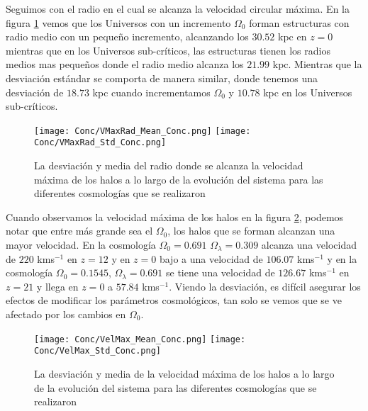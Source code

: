 Seguimos con el radio en el cual se alcanza la velocidad circular máxima. En la figura \ref{fig:Conc_VMaxRad} vemos que los Universos con un incremento $\Omega_0$ forman estructuras con radio medio con un pequeño incremento, alcanzando los $30.52$ kpc en $z=0$ mientras que en los Universos sub-críticos, las estructuras tienen los radios medios mas pequeños donde el radio medio alcanza los $21.99$ kpc. Mientras que la desviación estándar se comporta de manera similar, donde tenemos una desviación de $18.73$ kpc cuando incrementamos $\Omega_0$ y $10.78$ kpc en los Universos sub-críticos.

\begin{figure}[H]
      \centering
      \texttt{[image: Conc/VMaxRad\_Mean\_Conc.png]}
      \texttt{[image: Conc/VMaxRad\_Std\_Conc.png]}
      \caption[Evolución de la desviación y media del radio donde se alcanza la velocidad circular máxima de los halos para todas las cosmologías]{La desviación y media del radio donde se alcanza la velocidad máxima de los halos a lo largo de la evolución del sistema para las diferentes cosmologías que se realizaron}
      \label{fig:Conc_VMaxRad}
\end{figure}

Cuando observamos la velocidad máxima de los halos en la figura \ref{fig:Conc_VelMax}, podemos notar que entre más grande sea el $\Omega_0$, los halos que se forman alcanzan una mayor velocidad. En la cosmología $\Omega_0 = 0.691$ $\Omega_\lambda = 0.309$ alcanza una velocidad de $220$ kms$^{-1}$ en $z=12$ y en $z=0$ bajo a una velocidad de $106.07$ kms$^{-1}$ y en la cosmología  $\Omega_0 = 0.1545$, $\Omega_\lambda = 0.691$ se tiene una velocidad de $126.67$ kms$^{-1}$ en $z=21$ y llega en $z=0$ a $57.84$ kms$^{-1}$. Viendo la desviación, es difícil asegurar los efectos de modificar los parámetros cosmológicos, tan solo se vemos que se ve afectado por los cambios en $\Omega_0$.

\begin{figure}[H]
      \centering
      \texttt{[image: Conc/VelMax\_Mean\_Conc.png]}
      \texttt{[image: Conc/VelMax\_Std\_Conc.png]}
      \caption[Evolución de la desviación y media de la velocidad máxima de los halos para todas las cosmologías]{La desviación y media de la velocidad máxima de los halos a lo largo de la evolución del sistema para las diferentes cosmologías que se realizaron}
      \label{fig:Conc_VelMax}
\end{figure}

